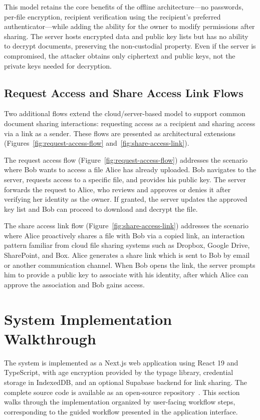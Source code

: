 This model retains the core benefits of the offline architecture---no passwords, per-file encryption, recipient verification using the recipient's preferred authenticator---while adding the ability for the owner to modify permissions after sharing. The server hosts encrypted data and public key lists but has no ability to decrypt documents, preserving the non-custodial property. Even if the server is compromised, the attacker obtains only ciphertext and public keys, not the private keys needed for decryption.

\subsection{Request Access and Share Access Link Flows}
\label{sec:request-share-flows}

Two additional flows extend the cloud/server-based model to support common document sharing interactions: requesting access as a recipient and sharing access via a link as a sender. These flows are presented as architectural extensions (Figures~\ref{fig:request-access-flow} and~\ref{fig:share-access-link}).

The request access flow (Figure~\ref{fig:request-access-flow}) addresses the scenario where Bob wants to access a file Alice has already uploaded. Bob navigates to the server, requests access to a specific file, and provides his public key. The server forwards the request to Alice, who reviews and approves or denies it after verifying her identity as the owner. If granted, the server updates the approved key list and Bob can proceed to download and decrypt the file.

The share access link flow (Figure~\ref{fig:share-access-link}) addresses the scenario where Alice proactively shares a file with Bob via a copied link, an interaction pattern familiar from cloud file sharing systems such as Dropbox\textregistered{}, Google Drive, SharePoint, and Box. Alice generates a share link which is sent to Bob by email or another communication channel. When Bob opens the link, the server prompts him to provide a public key to associate with his identity, after which Alice can approve the association and Bob gains access.

\section{System Implementation Walkthrough}
\label{sec:implementation}

The system is implemented as a Next.js\texttrademark{} web application using React\texttrademark{} 19 and TypeScript, with age encryption provided by the typage library, credential storage in IndexedDB, and an optional Supabase\texttrademark{} backend for link sharing. The complete source code is available as an open-source repository~\cite{docprotect_repo}. This section walks through the implementation organized by user-facing workflow steps, corresponding to the guided workflow presented in the application interface.

